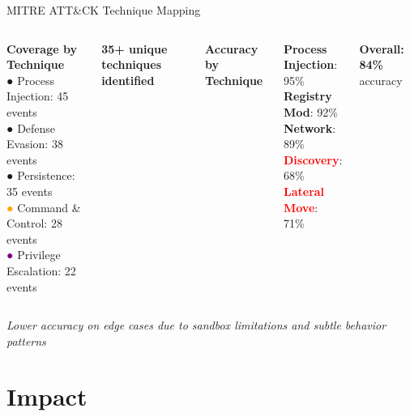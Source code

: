 \documentclass[11pt,aspectratio=16:9]{beamer}
\begin{document}
\begin{frame}{MITRE ATT\&CK Technique Mapping}
  \vspace{0.5cm}
  \begin{columns}
    {\textbf{\textcolor{accent1}{Coverage by Technique}}}\\[0.3cm]
    {\small \textcolor{accent1}{●} Process Injection: 45 events}\\
    {\small \textcolor{accent2}{●} Defense Evasion: 38 events}\\
    {\small \textcolor{accent3}{●} Persistence: 35 events}\\
    {\small \textcolor{orange}{●} Command \& Control: 28 events}\\
    {\small \textcolor{purple}{●} Privilege Escalation: 22 events}
    
    \vspace{0.4cm}
    \textbf{35+ unique techniques identified}
    
    {\textbf{\textcolor{accent1}{Accuracy by Technique}}}\\[0.3cm]
    \begin{tcolorbox}[colback=lightgray, colframe=darkblue]
      {\small
      \textbf{Process Injection}: 95\%\\
      \textbf{Registry Mod}: 92\%\\
      \textbf{Network}: 89\%\\
      \textcolor{red}{\textbf{Discovery}}: 68\%\\
      \textcolor{red}{\textbf{Lateral Move}}: 71\%
      }
    \end{tcolorbox}
    
    \vspace{0.3cm}
    \textbf{Overall: 84\%} accuracy
  \end{columns}
  
  \vspace{0.5cm}
  {\small \textit{Lower accuracy on edge cases due to sandbox limitations and subtle behavior patterns}}
\end{frame}

\section{Impact}
\end{document}

